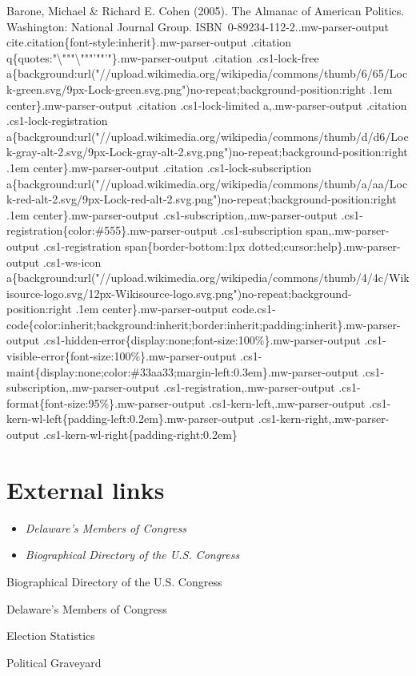 Barone, Michael \& Richard E. Cohen (2005). The Almanac of American
Politics. Washington: National Journal Group.
ISBN~0-89234-112-2..mw-parser-output
cite.citation\{font-style:inherit\}.mw-parser-output .citation
q\{quotes:"\textbackslash{}"""\textbackslash{}"""'""'"\}.mw-parser-output
.citation .cs1-lock-free
a\{background:url("//upload.wikimedia.org/wikipedia/commons/thumb/6/65/Lock-green.svg/9px-Lock-green.svg.png")no-repeat;background-position:right
.1em center\}.mw-parser-output .citation .cs1-lock-limited
a,.mw-parser-output .citation .cs1-lock-registration
a\{background:url("//upload.wikimedia.org/wikipedia/commons/thumb/d/d6/Lock-gray-alt-2.svg/9px-Lock-gray-alt-2.svg.png")no-repeat;background-position:right
.1em center\}.mw-parser-output .citation .cs1-lock-subscription
a\{background:url("//upload.wikimedia.org/wikipedia/commons/thumb/a/aa/Lock-red-alt-2.svg/9px-Lock-red-alt-2.svg.png")no-repeat;background-position:right
.1em center\}.mw-parser-output .cs1-subscription,.mw-parser-output
.cs1-registration\{color:\#555\}.mw-parser-output .cs1-subscription
span,.mw-parser-output .cs1-registration span\{border-bottom:1px
dotted;cursor:help\}.mw-parser-output .cs1-ws-icon
a\{background:url("//upload.wikimedia.org/wikipedia/commons/thumb/4/4c/Wikisource-logo.svg/12px-Wikisource-logo.svg.png")no-repeat;background-position:right
.1em center\}.mw-parser-output
code.cs1-code\{color:inherit;background:inherit;border:inherit;padding:inherit\}.mw-parser-output
.cs1-hidden-error\{display:none;font-size:100\%\}.mw-parser-output
.cs1-visible-error\{font-size:100\%\}.mw-parser-output
.cs1-maint\{display:none;color:\#33aa33;margin-left:0.3em\}.mw-parser-output
.cs1-subscription,.mw-parser-output .cs1-registration,.mw-parser-output
.cs1-format\{font-size:95\%\}.mw-parser-output
.cs1-kern-left,.mw-parser-output
.cs1-kern-wl-left\{padding-left:0.2em\}.mw-parser-output
.cs1-kern-right,.mw-parser-output
.cs1-kern-wl-right\{padding-right:0.2em\}

\section{External links}\label{external-links}

\begin{itemize}
\item
  \emph{Delaware's Members of Congress}
\item
  \emph{Biographical Directory of the U.S. Congress}
\end{itemize}

Biographical Directory of the U.S. Congress

Delaware's Members of Congress

Election Statistics

Political Graveyard
